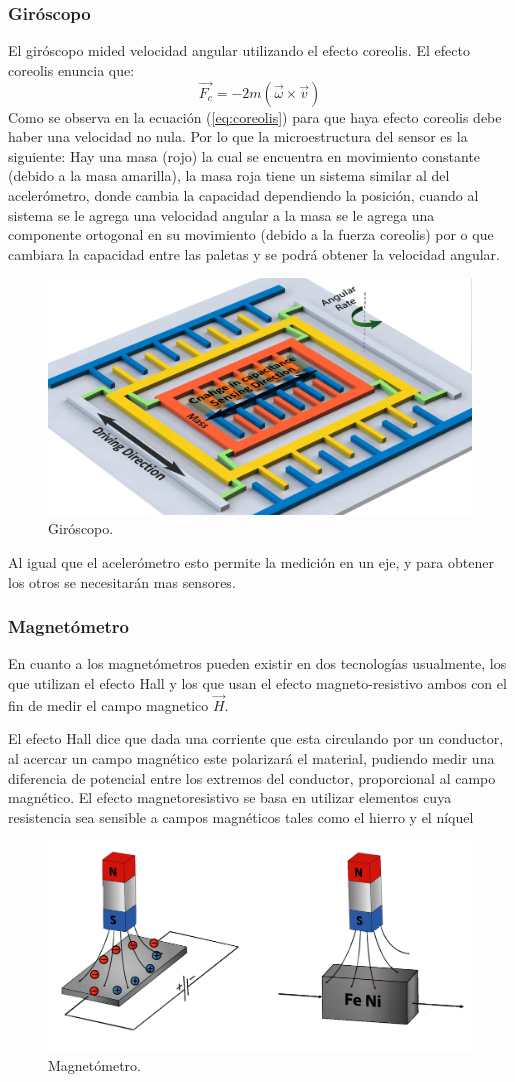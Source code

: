 \subsubsection{Giróscopo}
El gir\'oscopo mided velocidad angular utilizando el efecto coreolis. El efecto coreolis enuncia que:
\begin{equation}
\vec{F_c} = -2m \left( \vec{\omega} \times \vec{v} \right)
\label{eq:coreolis}
\end{equation}
Como se observa en la ecuaci\'on (\ref{eq:coreolis}) para que haya efecto coreolis debe haber una velocidad no nula. Por lo que la microestructura del sensor es la siguiente:
Hay una masa (rojo) la cual se encuentra en movimiento constante (debido a la masa amarilla), la masa roja tiene un sistema similar al del aceler\'ometro, donde cambia la capacidad dependiendo la posici\'on, cuando al sistema se le agrega una velocidad angular a la masa se le agrega una componente ortogonal en su movimiento (debido a la fuerza coreolis) por o que cambiara la capacidad entre las paletas y se podr\'a obtener la velocidad angular. 
 \begin{figure}[H]
	\center
	\includegraphics[width=0.5\linewidth, page=1]{Imagenes/giroscopo}
	\caption{Gir\'oscopo.}
	\label{fig:Esq_con:giroscopo}
\end{figure}
Al igual que el aceler\'ometro esto permite la medici\'on en un eje, y para obtener los otros se necesitar\'an mas sensores.
\subsubsection{Magnetómetro}  
En cuanto a los magnet\'ometros pueden existir en dos tecnolog\'ias usualmente, los que utilizan el efecto Hall y los que usan el efecto magneto-resistivo ambos con el fin de medir el campo magnetico $\vec{H}$.


El efecto Hall dice que dada una corriente que esta circulando por un conductor, al acercar un campo magnético este polarizar\'a el material, pudiendo medir una diferencia de potencial entre los extremos del conductor, proporcional al campo magnético. El efecto magnetoresistivo se basa en utilizar elementos cuya resistencia sea sensible a campos magn\'eticos tales como el hierro y el n\'iquel
 \begin{figure}[H]
	\center
	\includegraphics[width=0.5\linewidth, page=1]{Imagenes/magnetometro}
	\caption{Magnet\'ometro.}
	\label{fig:Esq_con:magnetometro}
\end{figure}

